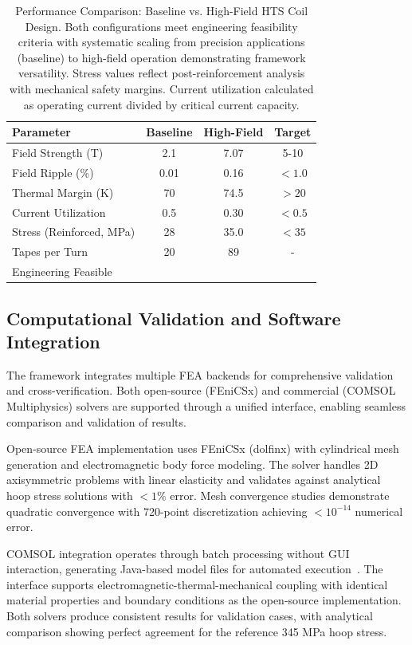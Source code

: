 \documentclass[10pt,twocolumn]{article}
\providecommand{\checkmark}{\ding{51}}
\begin{document}
\begin{table}[h]
\centering
\caption{Performance Comparison: Baseline vs. High-Field HTS Coil Design. Both configurations meet engineering feasibility criteria with systematic scaling from precision applications (baseline) to high-field operation demonstrating framework versatility. Stress values reflect post-reinforcement analysis with mechanical safety margins. Current utilization calculated as operating current divided by critical current capacity.}
\begin{tabular}{|l|c|c|c|}
\hline
\textbf{Parameter} & \textbf{Baseline} & \textbf{High-Field} & \textbf{Target} \\
\hline
Field Strength (T) & 2.1 & 7.07 & 5-10 \\
Field Ripple (\%) & 0.01 & 0.16 & $<1.0$ \\
Thermal Margin (K) & 70 & 74.5 & $>20$ \\
Current Utilization & 0.5 & 0.30 & $<0.5$ \\
Stress (Reinforced, MPa) & 28 & 35.0 & $<35$ \\
Tapes per Turn & 20 & 89 & - \\
Engineering Feasible & \checkmark & \checkmark & \checkmark \\
\hline
\end{tabular}
\label{tab:comparison}
\end{table}

\subsection{Computational Validation and Software Integration}

The framework integrates multiple FEA backends for comprehensive validation and cross-verification. Both open-source (FEniCSx) and commercial (COMSOL Multiphysics) solvers are supported through a unified interface, enabling seamless comparison and validation of results.

Open-source FEA implementation uses FEniCSx (dolfinx) with cylindrical mesh generation and electromagnetic body force modeling. The solver handles 2D axisymmetric problems with linear elasticity and validates against analytical hoop stress solutions with $<1\%$ error. Mesh convergence studies demonstrate quadratic convergence with 720-point discretization achieving $<10^{-14}$ numerical error.

COMSOL integration operates through batch processing without GUI interaction, generating Java-based model files for automated execution~\cite{comsol2023}. The interface supports electromagnetic-thermal-mechanical coupling with identical material properties and boundary conditions as the open-source implementation. Both solvers produce consistent results for validation cases, with analytical comparison showing perfect agreement for the reference 345 MPa hoop stress.
\end{document}
